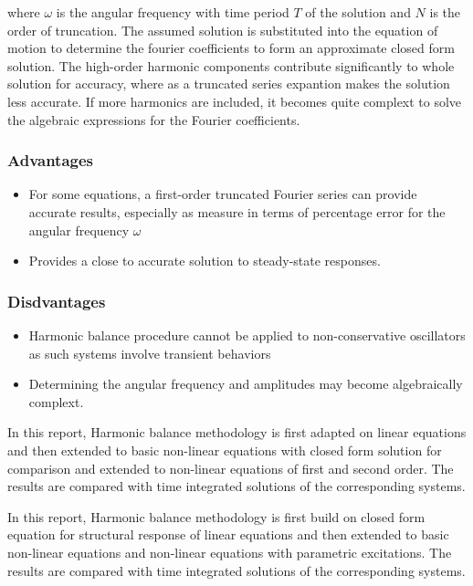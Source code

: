 \documentclass[12pt, a4paper]{extarticle}
\begin{document}
{{where $\omega$ is the angular frequency with time period $T$ of the solution and $N$ is the order of truncation. 
The assumed solution is substituted into the equation of motion to determine the fourier coefficients to form an approximate closed form solution. The high-order harmonic components contribute significantly to whole solution for accuracy, where as a truncated series expantion makes the solution less accurate. If more harmonics are included, it becomes quite complext to solve the algebraic expressions for the Fourier coefficients.

\subsubsection{Advantages}
\begin{itemize}
\item{For some equations, a first-order truncated Fourier series can provide accurate results, especially as measure in terms of percentage error for the angular frequency $\omega$}
\item{Provides a close to accurate solution to steady-state responses.}
\end{itemize}

\subsubsection{Disdvantages}
\begin{itemize}
\item{Harmonic balance procedure cannot be applied to non-conservative oscillators as such systems involve transient behaviors}
\item{Determining the angular frequency and amplitudes may become algebraically complext.}
\end{itemize}

In this report, Harmonic balance methodology is first adapted on  linear equations and then extended to basic non-linear equations with closed form solution for comparison and extended to non-linear equations of first and second order. The results are compared with time integrated solutions of the corresponding systems.}

In this report, Harmonic balance methodology is first build on closed form equation for structural response of linear equations and then extended to basic non-linear equations and non-linear equations with parametric excitations. The results are compared with time integrated solutions of the corresponding systems.}
\end{document}
